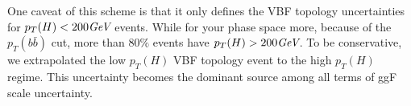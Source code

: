 One caveat of this scheme is that it only defines the VBF topology uncertainties for $p_T(H)<200\textit{GeV}$ events.
While for your phase space more, because of the $p_T(b\bar{b})$ cut, more than $80\%$ events have $p_T(H)>200\textit{GeV}$.
To be conservative, we extrapolated the low $p_T(H)$ VBF topology event to the high $p_T(H)$ regime. This uncertainty
becomes the dominant source among all terms of ggF scale uncertainty.

%
%
%

